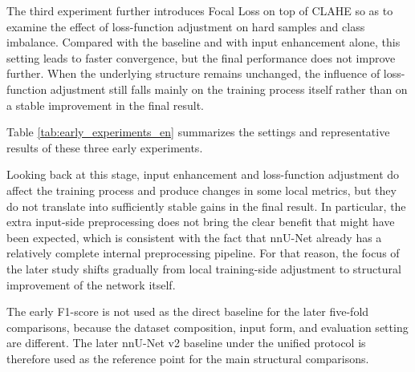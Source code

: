 \documentclass[a4paper,11pt]{article}
\begin{document}
The third experiment further introduces Focal Loss on top of CLAHE so as to examine the effect of loss-function adjustment on hard samples and class imbalance. Compared with the baseline and with input enhancement alone, this setting leads to faster convergence, but the final performance does not improve further. When the underlying structure remains unchanged, the influence of loss-function adjustment still falls mainly on the training process itself rather than on a stable improvement in the final result.

Table \ref{tab:early_experiments_en} summarizes the settings and representative results of these three early experiments.

\begin{table}[!htbp]
\centering
\caption{Summary of preliminary exploration experiments}
\label{tab:early_experiments_en}
\end{table}

Looking back at this stage, input enhancement and loss-function adjustment do affect the training process and produce changes in some local metrics, but they do not translate into sufficiently stable gains in the final result. In particular, the extra input-side preprocessing does not bring the clear benefit that might have been expected, which is consistent with the fact that nnU-Net already has a relatively complete internal preprocessing pipeline. For that reason, the focus of the later study shifts gradually from local training-side adjustment to structural improvement of the network itself.

The early F1-score is not used as the direct baseline for the later five-fold comparisons, because the dataset composition, input form, and evaluation setting are different. The later nnU-Net v2 baseline under the unified protocol is therefore used as the reference point for the main structural comparisons.
\end{document}
